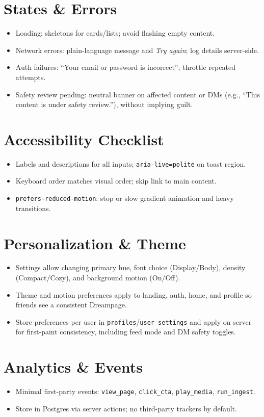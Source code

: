 \documentclass[11pt]{article}
\begin{document}
\section{States \& Errors}
\begin{itemize}
  \item Loading: skeletons for cards/lists; avoid flashing empty content.
  \item Network errors: plain-language message and \emph{Try again}; log details server-side.
  \item Auth failures: ``Your email or password is incorrect''; throttle repeated attempts.
  \item Safety review pending: neutral banner on affected content or DMs (e.g., ``This content is under safety review.''), without implying guilt.
\end{itemize}

\section{Accessibility Checklist}
\begin{itemize}
  \item Labels and descriptions for all inputs; \texttt{aria-live=polite} on toast region.
  \item Keyboard order matches visual order; skip link to main content.
  \item \texttt{prefers-reduced-motion}: stop or slow gradient animation and heavy transitions.
\end{itemize}

\section{Personalization \& Theme}
\begin{itemize}
  \item Settings allow changing primary hue, font choice (Display/Body), density (Compact/Cozy), and background motion (On/Off).
  \item Theme and motion preferences apply to landing, auth, home, and profile so friends see a consistent Dreampage.
  \item Store preferences per user in \texttt{profiles}/\texttt{user\_settings} and apply on server for first-paint consistency, including feed mode and DM safety toggles.
\end{itemize}

\section{Analytics \& Events}
\begin{itemize}
  \item Minimal first-party events: \texttt{view\_page}, \texttt{click\_cta}, \texttt{play\_media}, \texttt{run\_ingest}.
  \item Store in Postgres via server actions; no third-party trackers by default.
\end{itemize}
\end{document}
